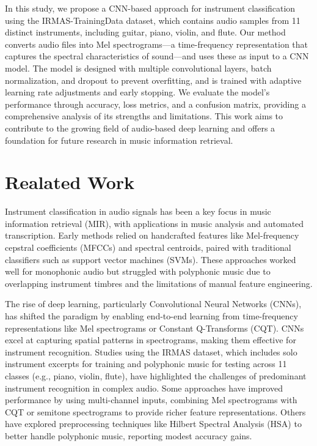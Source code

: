 \documentclass[conference]{IEEEtran}
\begin{document}
In this study, we propose a CNN-based approach for instrument classification using the IRMAS-TrainingData dataset, which contains audio samples from 11 distinct instruments, including guitar, piano, violin, and flute. Our method converts audio files into Mel spectrograms—a time-frequency representation that captures the spectral characteristics of sound—and uses these as input to a CNN model. The model is designed with multiple convolutional layers, batch normalization, and dropout to prevent overfitting, and is trained with adaptive learning rate adjustments and early stopping. We evaluate the model’s performance through accuracy, loss metrics, and a confusion matrix, providing a comprehensive analysis of its strengths and limitations. This work aims to contribute to the growing field of audio-based deep learning and offers a foundation for future research in music information retrieval.

\section{Realated Work}
Instrument classification in audio signals has been a key focus in music information retrieval (MIR), with applications in music analysis and automated transcription. Early methods relied on handcrafted features like Mel-frequency cepstral coefficients (MFCCs) and spectral centroids, paired with traditional classifiers such as support vector machines (SVMs). These approaches worked well for monophonic audio but struggled with polyphonic music due to overlapping instrument timbres and the limitations of manual feature engineering.

The rise of deep learning, particularly Convolutional Neural Networks (CNNs), has shifted the paradigm by enabling end-to-end learning from time-frequency representations like Mel spectrograms or Constant Q-Transforms (CQT). CNNs excel at capturing spatial patterns in spectrograms, making them effective for instrument recognition. Studies using the IRMAS dataset, which includes solo instrument excerpts for training and polyphonic music for testing across 11 classes (e.g., piano, violin, flute), have highlighted the challenges of predominant instrument recognition in complex audio. Some approaches have improved performance by using multi-channel inputs, combining Mel spectrograms with CQT or semitone spectrograms to provide richer feature representations. Others have explored preprocessing techniques like Hilbert Spectral Analysis (HSA) to better handle polyphonic music, reporting modest accuracy gains.
\end{document}

